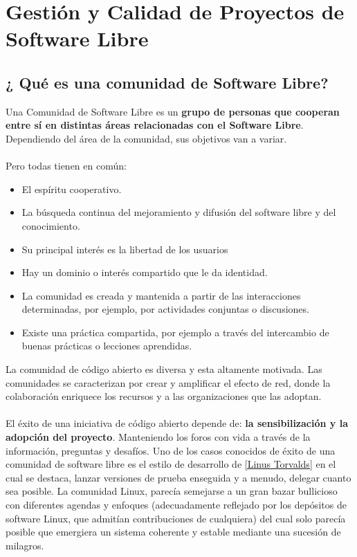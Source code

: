 \chapter{Gestión y Calidad de Proyectos de Software Libre}
\section{¿ Qué es una comunidad de Software Libre?}

Una Comunidad de Software Libre es un {\bf grupo de personas que cooperan entre sí en distintas áreas relacionadas con el Software Libre}. Dependiendo del área de la comunidad, sus objetivos van a variar.
\\
\\
Pero todas tienen en común:
\begin{itemize}
     \item El espíritu cooperativo. 
     \item La búsqueda continua del mejoramiento y difusión del software libre y del conocimiento.
     \item Su principal interés es la libertad de los usuarios
     \item Hay un dominio o interés compartido que le da identidad.
     \item La comunidad es creada y mantenida a partir de las interacciones determinadas, por ejemplo, por actividades conjuntas o discusiones.
     \item Existe una práctica compartida, por ejemplo a través del intercambio de buenas prácticas o lecciones aprendidas.
\end{itemize}

La comunidad de código abierto es diversa y esta altamente motivada. Las comunidades se caracterizan por crear y amplificar el efecto de red, donde la colaboración enriquece los recursos y a las organizaciones que las adoptan.
\\
\\
El éxito de una iniciativa de código abierto depende de: {\bf la sensibilización y la adopción del proyecto}. Manteniendo los foros con vida a través de la información, preguntas y desafíos.
Uno de los casos conocidos de éxito de una comunidad de software libre es el estilo de desarrollo de \ref{Linus Torvalds} en el cual se destaca, lanzar versiones de prueba enseguida y a menudo, delegar cuanto sea posible. La comunidad Linux, parecía semejarse a un gran bazar bullicioso con diferentes agendas y enfoques (adecuadamente reflejado por los depósitos de software Linux, que admitían contribuciones de cualquiera) del cual solo parecía posible que emergiera un sistema coherente y estable mediante una sucesión de milagros. 

